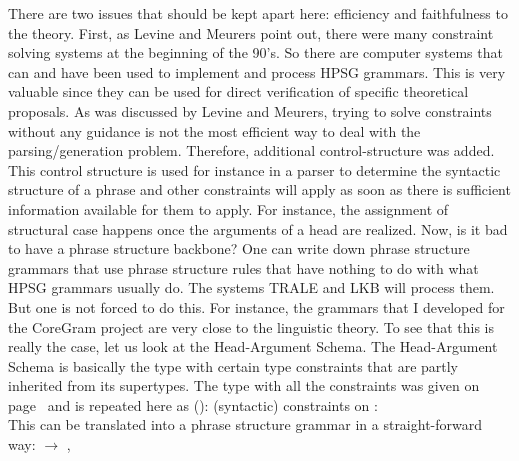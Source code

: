 There are two issues that should be kept apart here: efficiency and faithfulness to the
theory. First, as Levine and Meurers point out, there were many constraint solving systems at the
beginning of the 90's. So there are computer systems that can and have been used to implement
and process HPSG grammars. This is very valuable since they can be used for direct verification of
specific theoretical proposals. As was discussed by Levine and Meurers, trying to solve constraints
without any guidance is not the most efficient way to deal with the parsing/generation
problem. Therefore, additional control-structure was added. This control structure is used for
instance in a parser to determine the syntactic structure of a phrase and other constraints will
apply as soon as there is sufficient information available for them to apply. For instance, the
assignment of structural case happens once the arguments of a head are realized. Now, is it bad to
have a phrase structure backbone? One can write down phrase structure grammars that use phrase
structure rules that have nothing to do with what HPSG grammars usually do. The systems TRALE \citep*{MPR2002a-u,Penn2004a-u} and
LKB will process them. But one is not forced to do this. For instance, the grammars that I developed
for the CoreGram project \citep{MuellerCoreGramBrief,MuellerCoreGram} are very close to the linguistic theory. To see that this is really the
case, let us look at the Head-Argument Schema. The Head-Argument Schema is basically the type
 with certain type constraints that are partly inherited from its
supertypes. The type with all the constraints was given on page~\pageref{head-arg-schema-hfp} and is
repeated here as ():
\eas
\label{head-arg-schema-hfp-zwei}
(syntactic) constraints on :\\
\zs
This can be translated into a phrase structure grammar in a straight-forward way:
\eal
\ex {} $\to$ , 
